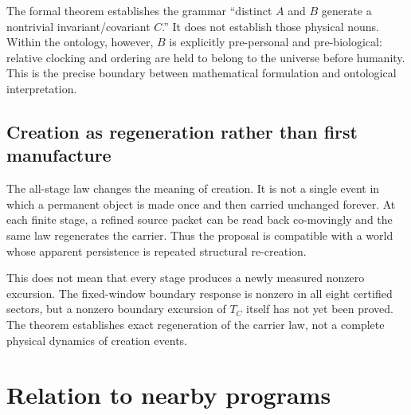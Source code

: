 \documentclass[11pt]{article}
\theoremstyle{definition}
\theoremstyle{remark}
\begin{document}
The formal theorem establishes the grammar ``distinct $A$ and $B$ generate a nontrivial invariant/covariant $C$.'' It does not establish those physical nouns. Within the ontology, however, $B$ is explicitly pre-personal and pre-biological: relative clocking and ordering are held to belong to the universe before humanity. This is the precise boundary between mathematical formulation and ontological interpretation.

\subsection{Creation as regeneration rather than first manufacture}

The all-stage law changes the meaning of creation. It is not a single event in which a permanent object is made once and then carried unchanged forever. At each finite stage, a refined source packet can be read back co-movingly and the same law regenerates the carrier. Thus the proposal is compatible with a world whose apparent persistence is repeated structural re-creation.

This does not mean that every stage produces a newly measured nonzero excursion. The fixed-window boundary response is nonzero in all eight certified sectors, but a nonzero boundary excursion of $T_C$ itself has not yet been proved. The theorem establishes exact regeneration of the carrier law, not a complete physical dynamics of creation events.

\section{Relation to nearby programs}
\end{document}
